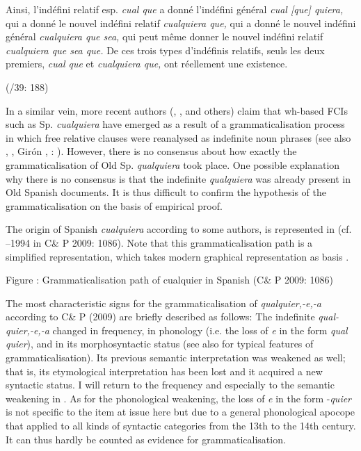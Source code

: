 Ainsi, l’indéfini relatif esp. \textit{cual que} a donné l’indéfini général \textit{cual [que] quiera,} qui a donné le nouvel indéfini relatif \textit{cualquiera que,} qui a donné le nouvel indéfini général \textit{cualquiera que sea,} qui peut même donner le nouvel indéfini relatif \textit{cualquiera que sea que.} De ces trois types d’indéfinis relatifs, seuls les deux premiers, \textit{cual que} et \textit{cualquiera que,} ont réellement une existence.

    (\citealt{Lombard1938}/39: 188)

In a similar vein, more recent authors (\citealt{Company-CompanyPozas-Loyo2009}, \citealt{Haspelmath1997}, and others) claim that wh-based FCIs such as Sp. \textit{cualquiera} have emerged as a result of a grammaticalisation process in which free relative clauses were reanalysed as indefinite noun phrases (see also \citealt{Palomo1934}, \citealt{Company-CompanyPozas-Loyo2009}, Girón \citealt{Alconchel2012}, \citealt{Brucart1999}: ). However, there is no consensus about how exactly the grammaticalisation of Old Sp. \textit{qualquiera} took place. One possible explanation why there is no consensus is that the indefinite \textit{qualquiera} was already present in Old Spanish documents. It is thus difficult to confirm the hypothesis of the grammaticalisation on the basis of empirical proof. 

  The origin of Spanish \textit{cualquiera} according to some authors, is represented in  (cf. \citealt{Cuervo1886}–1994 in C\& P 2009: 1086). Note that this grammaticalisation path is a simplified representation, which takes modern graphical representation as basis \citep{Elvira2007}. 

\begin{table}
Figure : Grammaticalisation path of cualquier in Spanish (C\& P 2009: 1086)
\end{table}

The most characteristic signs for the grammaticalisation of \textit{qualquier,-e,-a} according to C\& P (2009) are briefly described as follows: The indefinite \textit{qual-quier,\nobreakdash-e,\nobreakdash-a} changed in frequency, in phonology (i.e. the loss of \textit{e} in the form \textit{qual quier}), and in its morphosyntactic status (see also \citealt{Lehmann1995} for typical features of grammaticalisation). Its previous semantic interpretation was weakened as well; that is, its etymological interpretation has been lost and it acquired a new syntactic status. I will return to the frequency and especially to the semantic weakening in . As for the phonological weakening, the loss of \textit{e} in the form -\textit{quier} is not specific to the item at issue here but due to a general phonological apocope that applied to all kinds of syntactic categories from the 13th to the 14th century. It can thus hardly be counted as evidence for grammaticalisation.

